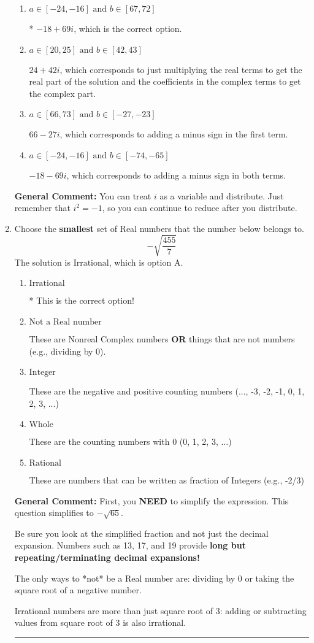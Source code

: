 \documentclass{extbook}[14pt]
\newcommand{\litem}[1]{\item #1

\rule{\textwidth}{0.4pt}}
\begin{document}
\begin{enumerate}
{\begin{enumerate}[label=\Alph*.]
 $66 + 27 i$, which corresponds to adding a minus sign in the second term.
\item \( a \in [-24, -16] \text{ and } b \in [67, 72] \)

* $-18 + 69 i$, which is the correct option.
\item \( a \in [20, 25] \text{ and } b \in [42, 43] \)

 $24 + 42 i$, which corresponds to just multiplying the real terms to get the real part of the solution and the coefficients in the complex terms to get the complex part.
\item \( a \in [66, 73] \text{ and } b \in [-27, -23] \)

 $66 - 27 i$, which corresponds to adding a minus sign in the first term.
\item \( a \in [-24, -16] \text{ and } b \in [-74, -65] \)

 $-18 - 69 i$, which corresponds to adding a minus sign in both terms.
\end{enumerate}

\textbf{General Comment:} You can treat $i$ as a variable and distribute. Just remember that $i^2=-1$, so you can continue to reduce after you distribute.
}
\litem{
Choose the \textbf{smallest} set of Real numbers that the number below belongs to.
\[ -\sqrt{\frac{455}{7}} \]The solution is \( \text{Irrational} \), which is option A.\begin{enumerate}[label=\Alph*.]
\item \( \text{Irrational} \)

* This is the correct option!
\item \( \text{Not a Real number} \)

These are Nonreal Complex numbers \textbf{OR} things that are not numbers (e.g., dividing by 0).
\item \( \text{Integer} \)

These are the negative and positive counting numbers (..., -3, -2, -1, 0, 1, 2, 3, ...)
\item \( \text{Whole} \)

These are the counting numbers with 0 (0, 1, 2, 3, ...)
\item \( \text{Rational} \)

These are numbers that can be written as fraction of Integers (e.g., -2/3)
\end{enumerate}

\textbf{General Comment:} First, you \textbf{NEED} to simplify the expression. This question simplifies to $-\sqrt{65}$. 
 
 Be sure you look at the simplified fraction and not just the decimal expansion. Numbers such as 13, 17, and 19 provide \textbf{long but repeating/terminating decimal expansions!} 
 
 The only ways to *not* be a Real number are: dividing by 0 or taking the square root of a negative number. 
 
 Irrational numbers are more than just square root of 3: adding or subtracting values from square root of 3 is also irrational.
}
\end{enumerate}
\end{document}
